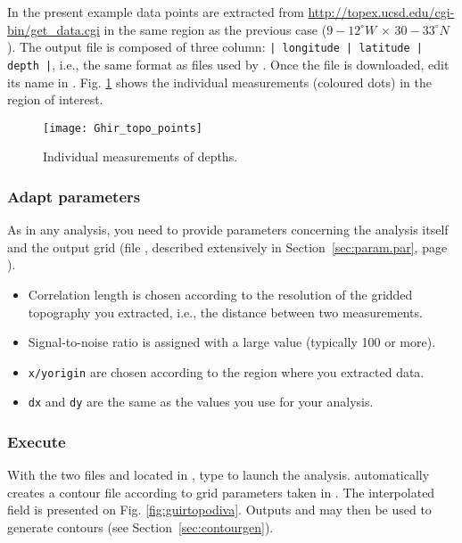 In the present example data points are extracted from \url{http://topex.ucsd.edu/cgi-bin/get_data.cgi} in the same region as the previous case ($9-12^{\circ}W\, \times\, 30-33^{\circ}N$). The output file is composed of three column: \texttt{| longitude | latitude | depth |}, i.e., the same format as  files used by \diva. Once the file is downloaded, edit its name in . Fig. \ref{fig:guirtopo} shows the individual measurements (coloured dots) in the region of interest. 


\begin{figure}[htpb]
\centering
\texttt{[image: Ghir\_topo\_points]}
\caption{Individual measurements of depths.\label{fig:guirtopo}}
\end{figure}


\subsubsection{Adapt parameters}

As in any \diva analysis, you need to provide parameters concerning the analysis itself and the output grid (file , described extensively in Section~\ref{sec:param.par}, page \pageref{sec:param.par}). 

\begin{itemize}
\item Correlation length is chosen according to the resolution of the gridded topography you extracted, i.e., the distance between two measurements.
\item Signal-to-noise ratio is assigned with a large value (typically 100 or more).
\item \texttt{x/yorigin} are chosen according to the region where you extracted data.
\item \texttt{dx} and \texttt{dy} are the same as the values you use for your analysis. 
\end{itemize}



\subsubsection{Execute }

With the two files  and  located in , type  to launch the analysis.  automatically creates a contour file according to grid parameters taken in . The interpolated field is presented on Fig. \ref{fig:guirtopodiva}. Outputs  and  may then be used to generate contours (see Section~\ref{sec:contourgen}). 



